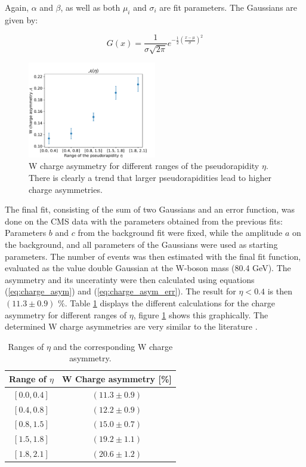 \documentclass[%
 reprint,
 amsmath,amssymb,
 aps,
]{revtex4-2}
\begin{document}
Again, $\alpha$ and $\beta$, as well as both $\mu_i$ and $\sigma_i$ are fit parameters. The Gaussians are given by:

\begin{equation}\label{eq:gaus}
    G(x) = \frac{1}{\sigma \sqrt{2 \pi}} e^{-\frac{1}{2} \left( \frac{x - \mu}{\sigma} \right)^2}
\end{equation}

\begin{figure}
    \centering
    \includegraphics[width=0.5\textwidth]{Plots/part2/A_eta.pdf}
    \caption{W charge asymmetry for different ranges of the pseudorapidity $\eta$. There is clearly a trend that larger pseudorapidities lead to higher charge asymmetries.}
    \label{fig:A_eta}
\end{figure}



The final fit, consisting of the sum of two Gaussians and an error function, was done on the CMS data with the parameters obtained from the previous fits: Parameters $b$ and $c$ from the background fit were fixed, while the amplitude $a$ on the background, and all parameters of the Gaussians were used as starting parameters. The number of events was then estimated with the final fit function, evaluated as the value double Gaussian at the W-boson mass (80.4 GeV). 
The asymmetry and its unceratinty were then calculated using equations (\ref{eq:charge_asym}) and (\ref{eq:charge_asym_err}). The result for $\eta < 0.4$ is then $(11.3 \pm 0.9)$ \%. Table \ref{tab:asymmetry_etas} displays the different calculations for the charge asymmetry for different ranges of $\eta$, figure \ref{fig:A_eta} shows this graphically. 
The determined W charge asymmetries are very similar to the literature \cite{cms_collaboration_measurements_2020, saha_measurement_2013}.

\begin{table}
    \centering
    \begin{tabular}{|c|c|}
    \hline
    Range of $\eta$     & W Charge asymmetry [\%] \\
    \hline
    $[0.0, 0.4]$          & $(11.3 \pm 0.9)$ \\
    $[0.4, 0.8]$          & $(12.2 \pm 0.9)$ \\
    $[0.8, 1.5]$          & $(15.0 \pm 0.7)$ \\
    $[1.5, 1.8]$          & $(19.2 \pm 1.1)$ \\
    $[1.8, 2.1]$          & $(20.6 \pm 1.2)$ \\
    \hline
    \end{tabular}
    \caption{Ranges of $\eta$ and the corresponding W charge asymmetry.  }
    \label{tab:asymmetry_etas}
\end{table}
\end{document}

